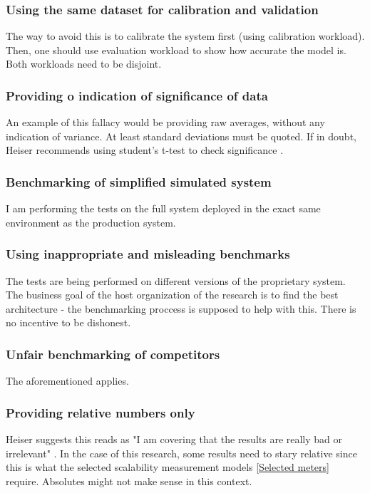 \documentclass{uvamscse}
\begin{document}
\subsubsection{Using the same dataset for calibration and validation}
The way to avoid this is to calibrate the system first (using calibration workload). Then, one should use evaluation workload to show how accurate the model is. Both workloads need to be disjoint.

\subsubsection{Providing o indication of significance of data}
An example of this fallacy would be providing raw averages, without any indication of variance. At least standard deviations must be quoted. If in doubt, Heiser recommends using student's t-test to check significance \cite{GerHeiBench}.

\subsubsection{Benchmarking of simplified simulated system}
I am performing the tests on the full system deployed in the exact same environment as the production system.

\subsubsection{Using inappropriate and misleading benchmarks}
The tests are being performed on different versions of the proprietary system. The business goal of the host organization of the research is to find the best architecture - the benchmarking proccess is supposed to help with this. There is no incentive to be dishonest.

\subsubsection{Unfair benchmarking of competitors}
The aforementioned applies.

\subsubsection{Providing relative numbers only}
Heiser suggests this reads as "I am covering that the results are really bad or irrelevant" \cite{GerHeiBench}. In the case of this research, some results need to stary relative since this is what the selected scalability measurement models \ref{Selected meters} require. Absolutes might not make sense in this context.
\end{document}

